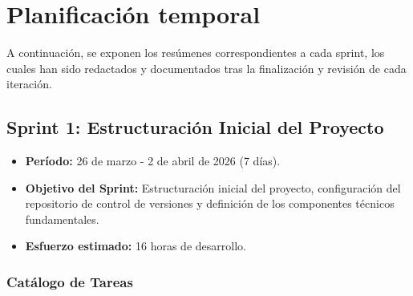 \section{Planificación temporal}

A continuación, se exponen los resúmenes correspondientes a cada sprint, los cuales han sido redactados y documentados tras la finalización y revisión de cada iteración.

\subsection{Sprint 1: Estructuración Inicial del Proyecto}

\begin{itemize}
    \item \textbf{Período:} 26 de marzo - 2 de abril de 2026 (7 días).
    \item \textbf{Objetivo del Sprint:} Estructuración inicial del proyecto, configuración del repositorio de control de versiones y definición de los componentes técnicos fundamentales.
    \item \textbf{Esfuerzo estimado:} 16 horas de desarrollo.
\end{itemize}

\subsubsection{Catálogo de Tareas}

\begin{table}[H]
    \centering
    \caption{Catálogo de tareas del Sprint 1.}
\end{table}

